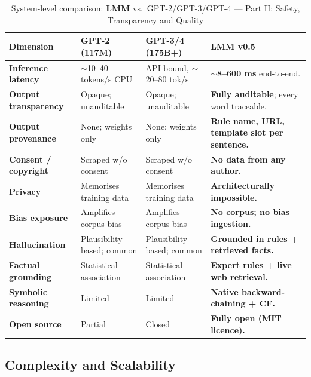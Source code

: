 \documentclass[11pt,a4paper]{article}
\newcommand{\lmm}{\texorpdfstring{%
  \textbf{\color{lmmAccent}LMM}}{LMM}}
\begin{document}
\begin{table}[H]
\centering
\caption{System-level comparison: \lmm{} vs.\ GPT-2/GPT-3/GPT-4 --- Part II: Safety, Transparency and Quality}
\label{tab:compare2}
\renewcommand{\arraystretch}{1.30}
\setlength{\tabcolsep}{5pt}
\begin{tabularx}{\linewidth}{@{}>{\bfseries}p{3.4cm} X X X@{}}
\toprule
\rowcolor{lmmHeaderBg}
{\color{white}\textbf{Dimension}} &
{\color{white}\textbf{GPT-2 (117M)}} &
{\color{white}\textbf{GPT-3/4 (175B+)}} &
{\color{white}\textbf{\lmm{} v0.5}} \\
\midrule
\rowcolor{white}
Inference latency &
$\sim$10--40 tokens/s CPU &
API-bound, $\sim$20--80 tok/s &
\textbf{$\sim$8--600 ms} end-to-end. \\
\rowcolor{lmmRowAlt}
Output transparency &
Opaque; unauditable &
Opaque; unauditable &
\textbf{Fully auditable}; every word traceable. \\
\rowcolor{white}
Output provenance &
None; weights only &
None; weights only &
\textbf{Rule name, URL, template slot per sentence.} \\
\rowcolor{lmmRowAlt}
Consent / copyright &
Scraped w/o consent \citep{grynbaum2023nyt} &
Scraped w/o consent &
\textbf{No data from any author.} \\
\rowcolor{white}
Privacy &
Memorises training data \citep{ippolito2022} &
Memorises training data &
\textbf{Architecturally impossible.} \\
\rowcolor{lmmRowAlt}
Bias exposure &
Amplifies corpus bias \citep{gallegos2023bias} &
Amplifies corpus bias &
\textbf{No corpus; no bias ingestion.} \\
\rowcolor{white}
Hallucination &
Plausibility-based; common \citep{bang2023multitask} &
Plausibility-based; common &
\textbf{Grounded in rules + retrieved facts.} \\
\rowcolor{lmmRowAlt}
Factual grounding &
Statistical association &
Statistical association &
\textbf{Expert rules + live web retrieval.} \\
\rowcolor{white}
Symbolic reasoning &
Limited \citep{kiciman2023causal} &
Limited &
\textbf{Native backward-chaining + CF.} \\
\rowcolor{lmmRowAlt}
Open source &
Partial &
Closed &
\textbf{Fully open (MIT licence).} \\
\bottomrule
\end{tabularx}
\end{table}

\subsection{Complexity and Scalability}
\end{document}
